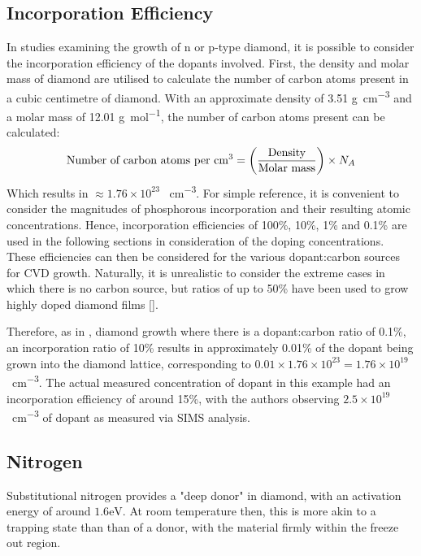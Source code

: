 \subsection{Incorporation Efficiency}
\label{subsection:incorporation_efficiency}
In studies examining the growth of n or p-type diamond, it is possible to consider the incorporation efficiency of the dopants involved. First, the density and molar mass of diamond are utilised to calculate the number of carbon atoms present in a cubic centimetre of diamond. With an approximate density of 3.51 \si{\gram\per\centi\metre\cubed} and a molar mass of 12.01 \si{\gram\per\mole}, the number of carbon atoms present can be calculated:
\begin{equation}
    \text{Number of carbon atoms per \si{\centi\metre\cubed}} = \left(\frac{\text{Density}}{\text{Molar mass}}\right)\times N_{A}
    \label{eq:incorporation_efficiency}
\end{equation}
Which results in $\approx1.76\times10^{23}$ \si{\atoms\per\centi\metre\cubed}. For simple reference, it is convenient to consider the magnitudes of phosphorous incorporation and their resulting atomic concentrations. Hence, incorporation efficiencies of 100\%, 10\%, 1\% and 0.1\% are used in the following sections in consideration of the doping concentrations. These efficiencies can then be considered for the various dopant:carbon sources for CVD growth. Naturally, it is unrealistic to consider the extreme cases in which there is no carbon source, but ratios of up to 50\% have been used to grow highly doped diamond films [\cite{kato2009,grotjohn2014}]. 

Therefore, as in \cite{koizumi1997}, diamond growth where there is a dopant:carbon ratio of 0.1\%, an incorporation ratio of 10\% results in approximately 0.01\% of the dopant being grown into the diamond lattice, corresponding to $0.01\times1.76\times10^{23}=1.76\times10^{19}$ \si{\atoms\per\centi\metre\cubed}. The actual measured concentration of dopant in this example had an incorporation efficiency of around 15\%, with the authors observing $2.5\times10^{19}$ \si{\atoms\per\centi\metre\cubed} of dopant as measured via SIMS analysis. 


\subsection{Nitrogen}
Substitutional nitrogen provides a "deep donor" in diamond, with an activation energy of around $1.6\si{\electronvolt}$. At room temperature then, this is more akin to a trapping state than than of a donor, with the material firmly within the freeze out region.

